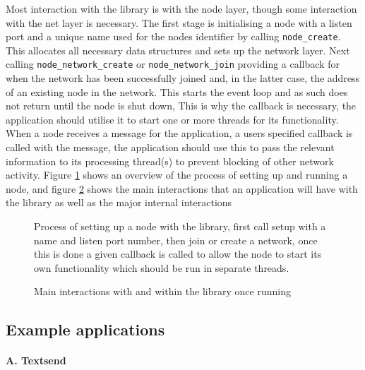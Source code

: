 \documentclass{article}
\begin{document}
Most interaction with the library is with the node layer, though some interaction with the net layer is necessary.
The first stage is initialising a node with a listen port and a unique name used for the nodes identifier by calling \texttt{node\_create}. This allocates all necessary data structures and sets up the network layer.
Next calling \texttt{node\_network\_create} or \texttt{node\_network\_join} providing a callback for when the network has been successfully joined and, in the latter case, the address of an existing node in the network.
This starts the event loop and as such does not return until the node is shut down, This is why the callback is necessary, the application should utilise it to start one or more threads for its functionality.
When a node receives a message for the application, a users specified callback is called with the message, the application should use this to pass the relevant information to its processing thread(s) to prevent blocking of other network activity.
Figure \ref{fig:startlib} shows an overview of the process of setting up and running a node, and figure \ref{fig:runlib} shows the main interactions that an application will have with the library as well as the major internal interactions

\begin{figure}
\centering
\def\svgwidth{\columnwidth}

\caption{Process of setting up a node with the library, first call setup with a name and listen port number, then join or create a network, once this is done a given callback is called to allow the node to start its own functionality which should be run in separate threads.}
\label{fig:startlib}
\end{figure}


\begin{figure}
\centering
\def\svgwidth{1.4\columnwidth}
\begin{scriptsize}
\makebox[\columnwidth][c]{}
\end{scriptsize}
\caption{Main interactions with and within the library once running }
\label{fig:runlib}
\end{figure}

\subsection{Example applications}

\paragraph{A. Textsend}
\end{document}
